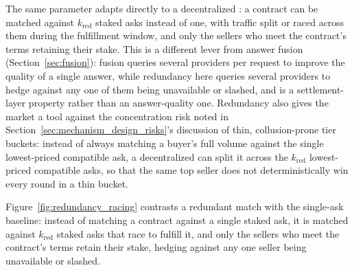 The same parameter adapts directly to a decentralized \NoesisMarket: a
contract can be matched against $k_{\text{red}}$ staked asks instead of
one, with traffic split or raced across them during the fulfillment
window, and only the sellers who meet the contract's terms retaining their
stake. This is a different lever from answer fusion
(Section~\ref{sec:fusion}): fusion queries several providers per request
to improve the quality of a single answer, while redundancy here queries
several providers to hedge against any one of them being unavailable or
slashed, and is a settlement-layer property rather than an answer-quality
one. Redundancy also gives the market a tool against the concentration
risk noted in Section~\ref{sec:mechanism_design_risks}'s discussion of
thin, collusion-prone tier buckets: instead of always matching a buyer's
full volume against the single lowest-priced compatible ask, a
decentralized \NoesisMarket{} can split it across the $k_{\text{red}}$
lowest-priced compatible asks, so that the same top seller does not
deterministically win every round in a thin bucket.

Figure~\ref{fig:redundancy_racing} contrasts a redundant match with the
single-ask baseline: instead of matching a contract against a single
staked ask, it is matched against $k_{\text{red}}$ staked asks that race
to fulfill it, and only the sellers who meet the contract's terms retain
their stake, hedging against any one seller being unavailable or slashed.

